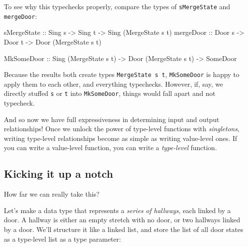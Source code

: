 \documentclass[]{article}
\newenvironment{Shaded}{}{}
\newcommand{\DataTypeTok}[1]{\textcolor[rgb]{0.56,0.13,0.00}{#1}}
\newcommand{\NormalTok}[1]{#1}
\newcommand{\OtherTok}[1]{\textcolor[rgb]{0.00,0.44,0.13}{#1}}
\begin{document}
To see why this typechecks properly, compare the types of \texttt{sMergeState}
and \texttt{mergeDoor}:

\begin{Shaded}
\begin{Highlighting}[]
\OtherTok{sMergeState ::} \DataTypeTok{Sing}\NormalTok{ s }\OtherTok{{-}\textgreater{}} \DataTypeTok{Sing}\NormalTok{ t }\OtherTok{{-}\textgreater{}} \DataTypeTok{Sing}\NormalTok{ (}\DataTypeTok{MergeState}\NormalTok{ s t)}
\OtherTok{mergeDoor   ::} \DataTypeTok{Door}\NormalTok{ s }\OtherTok{{-}\textgreater{}} \DataTypeTok{Door}\NormalTok{ t }\OtherTok{{-}\textgreater{}} \DataTypeTok{Door}\NormalTok{ (}\DataTypeTok{MergeState}\NormalTok{ s t)}

\DataTypeTok{MkSomeDoor}\OtherTok{  ::} \DataTypeTok{Sing}\NormalTok{ (}\DataTypeTok{MergeState}\NormalTok{ s t) }\OtherTok{{-}\textgreater{}} \DataTypeTok{Door}\NormalTok{ (}\DataTypeTok{MergeState}\NormalTok{ s t) }\OtherTok{{-}\textgreater{}} \DataTypeTok{SomeDoor}
\end{Highlighting}
\end{Shaded}

Because the results both create types \texttt{MergeState\ s\ t},
\texttt{MkSomeDoor} is happy to apply them to each other, and everything
typechecks. However, if, say, we directly stuffed \texttt{s} or \texttt{t} into
\texttt{MkSomeDoor}, things would fall apart and not typecheck.

And so now we have full expressiveness in determining input and output
relationships! Once we unlock the power of type-level functions with
\emph{singletons}, writing type-level relationships become as simple as writing
value-level ones. If you can write a value-level function, you can write a
\emph{type-level} function.

\subsection{Kicking it up a notch}\label{kicking-it-up-a-notch}

How far we can really take this?

Let's make a data type that represents a \emph{series of hallways}, each linked
by a door. A hallway is either an empty stretch with no door, or two hallways
linked by a door. We'll structure it like a linked list, and store the list of
all door states as a type-level list as a type parameter:
\end{document}
